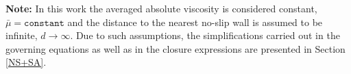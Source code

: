 \documentclass[10pt]{article}
\newcommand{\pp}[2]{\frac{\partial #1}{\partial #2}}
\newcommand{\bmu}{\bar{\mu}}
\begin{document}
\textbf{Note:} In this work the averaged absolute viscosity is considered constant, $\bmu=\texttt{constant}$ and the distance to the nearest no-slip wall is assumed to be infinite, $d\rightarrow\infty$.
Due to such assumptions, the simplifications carried out in the governing equations as well as in the closure expressions  are presented in Section \ref{NS+SA}.
%
% 
% 
% 
\end{document}
